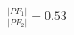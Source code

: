 \documentclass[preview]{standalone}
\begin{document}
\begin{align*}
\frac{|PF_1|}{|PF_2|} = 0.53
\end{align*}
\end{document}
